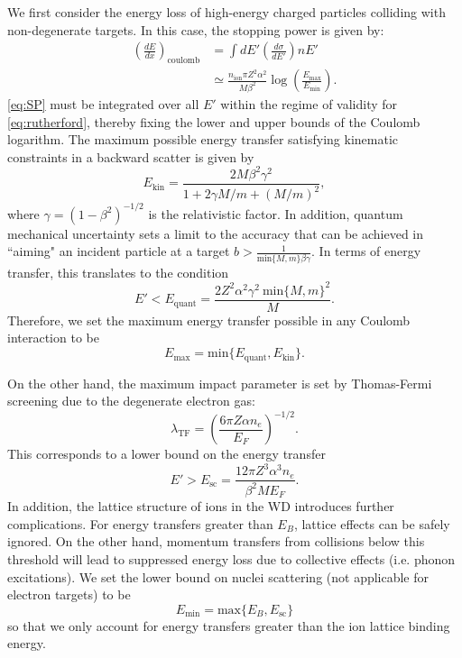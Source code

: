 \documentclass[twocolumn,showpacs,preprintnumbers,amsmath,amssymb,prd]{revtex4}
\def\r{\right)}
\def\l{\left(}
\begin{document}
\begin{appendices}
We first consider the energy loss of high-energy charged particles colliding with non-degenerate targets. In this case, the stopping power is given by:
\begin{align}
\label{eq:SP}
\l \frac{dE}{dx}\r_\text{coulomb} & =  \int dE' \left(\frac{d \sigma}{dE'}\right) n E' \\
& \simeq \frac{n_\text{ion} \pi Z^2 \alpha^2}{M \beta^2} \log {\l\frac{E_{\text{max}}}{E_{\text{min}}}\r}.
\end{align}
\eqref{eq:SP} must be integrated over all $E'$ within the regime of validity for \eqref{eq:rutherford}, thereby fixing the lower and upper bounds of the Coulomb logarithm. The maximum possible energy transfer satisfying kinematic constraints in a backward scatter is given by
\begin{equation}
E_{\text{kin}} = \frac{2 M \beta^2 \gamma^2}{1+ 2\gamma M/m +(M/m)^2},
\end{equation}
where $\gamma = (1-\beta^2)^{-1/2}$ is the relativistic factor. In addition, quantum mechanical uncertainty sets a limit to the accuracy that can be achieved in ``aiming" an incident particle at a target $b > \frac{1}{\text{min}\{{M, m}\} \beta \gamma}$. In terms of energy transfer, this translates to the condition
\begin{equation}
E' < E_\text{quant} = \frac{2 Z^2 \alpha^2 \gamma^2 ~\text{min}\{{M, m}\}^2}{M}.
\end{equation}
Therefore, we set the maximum energy transfer possible in any Coulomb interaction to be
\begin{equation}
E_{\text{max}} = \text{min}\{E_\text{quant}, E_{\text{kin}}\}.
\end{equation}

On the other hand, the maximum impact parameter is set by Thomas-Fermi screening due to the degenerate electron gas:
\begin{equation}
\label{eq:TF}
\lambda_{\text{TF}} = \l \frac{6 \pi Z \alpha n_e}{E_F}\r^{-1/2}.
\end{equation}
This corresponds to a lower bound on the energy transfer
\begin{equation}
E' > E_{\text{sc}} = \frac{12 \pi Z^3 \alpha ^3 n_e}{\beta^2 M E_F}.
\end{equation}
In addition, the lattice structure of ions in the WD introduces further complications. For energy transfers greater than $E_B$, lattice effects can be safely ignored. On the other hand, momentum transfers from collisions below this threshold will lead to suppressed energy loss due to collective effects (i.e. phonon excitations). We set the lower bound on nuclei scattering (not applicable for electron targets) to be
\begin{equation}
E_{\text{min}} = \text{max} \{E_B,E_{\text{sc}}\}
\end{equation}
so that we only account for energy transfers greater than the ion lattice binding energy.


\end{appendices}
\end{document}
